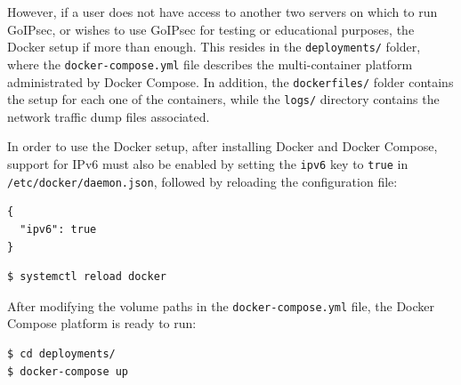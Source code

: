 \documentclass[a4paper,12pt]{report}
\begin{document}
		However, if a user does not have access to another two servers on which to run GoIPsec, or wishes to use GoIPsec for testing or educational purposes, the Docker setup if more than enough. This resides in the \texttt{deployments/} folder, where the \texttt{docker-compose.yml} file describes the multi-container platform administrated by Docker Compose. In addition, the \texttt{dockerfiles/} folder contains the setup for each one of the containers, while the \texttt{logs/} directory contains the network traffic dump files associated.
		
		In order to use the Docker setup, after installing Docker and Docker Compose, support for IPv6 must also be enabled by setting the \texttt{ipv6} key to \texttt{true} in \texttt{/etc/docker/daemon.json}, followed by reloading the configuration file:
		\begin{lstlisting}[caption=Contents of \texttt{/etc/docker.daemon.json} in order for Docker to have IPv6 capabilities.]
{
  "ipv6": true
}
		\end{lstlisting}
				\begin{lstlisting}[caption=Reload Docker configuration file., language=bash]
$ systemctl reload docker
		\end{lstlisting}
		After modifying the volume paths in the \texttt{docker-compose.yml} file, the Docker Compose platform is ready to run:
		\begin{lstlisting}[caption=Run Docker Compose setup.]
$ cd deployments/
$ docker-compose up
		\end{lstlisting}
		
\end{document}

